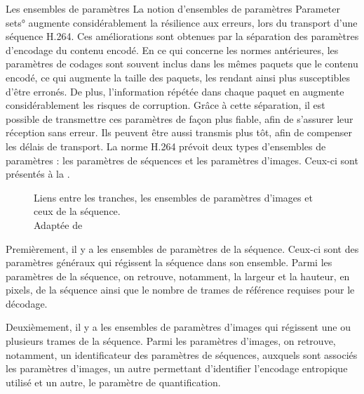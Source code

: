 \begin{section}{Les ensembles de paramètres}
\label{sect-ParameterSets}
La notion d'ensembles de paramètres \ang{Parameter sets} augmente
considérablement la résilience aux erreurs, lors du transport d'une séquence
H.264. Ces améliorations sont obtenues par la séparation des paramètres
d'encodage du contenu encodé. En ce qui concerne les normes antérieures, les
paramètres de codages sont souvent inclus dans les mêmes paquets que le contenu
encodé, ce qui augmente la taille des paquets, les rendant ainsi plus
susceptibles d'être erronés. De plus, l'information répétée dans chaque paquet
en augmente considérablement les risques de corruption. Grâce à cette
séparation, il est possible de transmettre ces paramètres de façon plus fiable,
afin de s'assurer leur réception sans erreur. Ils peuvent être aussi transmis
plus tôt, afin de compenser les délais de transport. La norme H.264 prévoit deux
types d'ensembles de paramètres : les paramètres de séquences et les paramètres
d'images. Ceux-ci sont présentés à la .

\begin{figure}
	\centering
	\caption[Liens entre les tranches, les ensembles de paramètres d'images et
ceux de la séquence]{Liens entre les tranches, les ensembles de paramètres d'images et
ceux de la séquence.\\Adaptée de \citet[p.~53]{Superiori2006}}
	\label{fig-ParameterSet}
\end{figure}

Premièrement, il y a les ensembles de paramètres de la séquence. Ceux-ci sont
des paramètres généraux qui régissent la séquence dans son ensemble. Parmi les
paramètres de la séquence, on retrouve, notamment, la largeur et la hauteur, en
pixels, de la séquence ainsi que le nombre de trames de référence requises pour
le décodage.

Deuxièmement, il y a les ensembles de paramètres d'images qui régissent une ou
plusieurs trames de la séquence. Parmi les paramètres d'images, on retrouve,
notamment, un identificateur des paramètres de séquences, auxquels sont
associés les paramètres d'images, un autre permettant d'identifier
l'encodage entropique utilisé et un autre, le paramètre de quantification.
\end{section}

